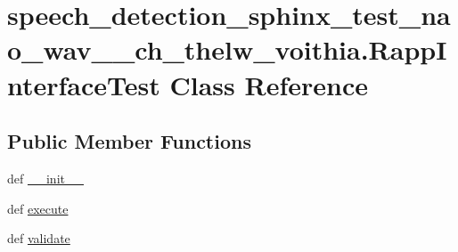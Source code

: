 \hypertarget{classspeech__detection__sphinx__test__nao__wav__1__ch__thelw__voithia_1_1RappInterfaceTest}{\section{speech\-\_\-detection\-\_\-sphinx\-\_\-test\-\_\-nao\-\_\-wav\-\_\-\_\-ch\-\_\-thelw\-\_\-voithia.\-Rapp\-Interface\-Test Class Reference}
\label{classspeech__detection__sphinx__test__nao__wav__1__ch__thelw__voithia_1_1RappInterfaceTest}
}
\subsection*{Public Member Functions}
\begin{DoxyCompactItemize}
\item 
def \hyperlink{classspeech__detection__sphinx__test__nao__wav__1__ch__thelw__voithia_1_1RappInterfaceTest_a1bd0b6f0389c7a1bd06055293d586063}{\-\_\-\-\_\-init\-\_\-\-\_\-}
\item 
def \hyperlink{classspeech__detection__sphinx__test__nao__wav__1__ch__thelw__voithia_1_1RappInterfaceTest_a2a53c327c0825f7316087a40c20c4db6}{execute}
\item 
def \hyperlink{classspeech__detection__sphinx__test__nao__wav__1__ch__thelw__voithia_1_1RappInterfaceTest_a37a8877b9ee90415f3c3278b01794666}{validate}
\end{DoxyCompactItemize}
